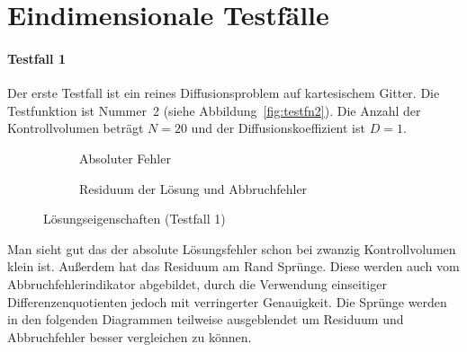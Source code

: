 \section{Eindimensionale Testfälle}

\paragraph{Testfall 1}
Der erste Testfall ist ein reines Diffusionsproblem auf kartesischem
Gitter. Die Testfunktion ist Nummer~2 (siehe Abbildung~\ref{fig:testfn2}).
Die Anzahl der Kontrollvolumen beträgt $N=20$ und der Diffusionskoeffizient
ist $D = 1$.
\begin{figure}[ht]
\centering
   \begin{subfigure}{0.49\linewidth} \centering
     \caption{Absoluter Fehler}
   \end{subfigure}
   \begin{subfigure}{0.49\linewidth} \centering
     \vspace{15pt}
  \caption{Residuum der Lösung und Abbruchfehler}
   \end{subfigure}
   \caption{Lösungseigenschaften (Testfall 1)}
\end{figure}
Man sieht gut das der absolute Lösungsfehler schon bei zwanzig Kontrollvolumen klein ist.
Außerdem hat das Residuum am Rand Sprünge. Diese werden auch vom Abbruchfehlerindikator abgebildet,
durch die Verwendung einseitiger Differenzenquotienten jedoch mit verringerter Genauigkeit.
Die Sprünge werden in den folgenden Diagrammen teilweise ausgeblendet um
Residuum und Abbruchfehler besser vergleichen zu können.

